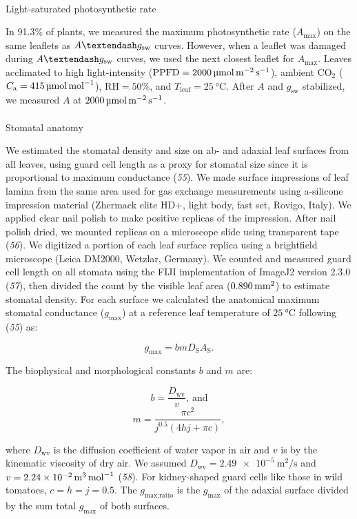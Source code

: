 \documentclass[
  letterpaper,
  DIV=11,
  numbers=noendperiod]{scrartcl}
\makeatletter
\let\oldparagraph\paragraph
\renewcommand{\paragraph}{
    \@ifstar
      \xxxParagraphStar
      \xxxParagraphNoStar
  }
\newcommand{\xxxParagraphStar}[1]{\oldparagraph*{#1}\mbox{}}
\newcommand{\xxxParagraphNoStar}[1]{\oldparagraph{#1}\mbox{}}
\newcommand{\agcurve}{$A \textendash g_\text{sw}$}
\newcommand{\caequals}[1]{$C_\mathrm{a} = \qty{#1}{\micro\mol\raiseto{-1}\mol}$}
\newcommand{\gmax}{$g_\text{max}$}
\newcommand{\gmaxratio}{$g_\text{max,ratio}$}
\newcommand{\gsw}{$g_\text{sw}$}
\newcommand{\ppfdequals}[1]{$\mathrm{PPFD} = \qty{#1}{\micro\mol\raiseto{-2}\meter\raiseto{-1}\second}$}
\newcommand{\rhequals}[1]{$\mathrm{RH} = #1\%$}
\newcommand{\tleafequals}[1]{$T_\mathrm{leaf} = \qty{#1}{\degreeCelsius}$}
\makeatother
\begin{document}
\paragraph{Light-saturated photosynthetic
rate}\label{light-saturated-photosynthetic-rate}

In 91.3\% of plants, we measured the maximum photosynthetic rate
(\(A_\mathrm{max}\)) on the same leaflets as \agcurve{} curves. However,
when a leaflet was damaged during \agcurve{} curves, we used the next
closest leaflet for \(A_\mathrm{max}\). Leaves acclimated to high
light-intensity (\ppfdequals{2000}), ambient CO\(_2\) (\caequals{415}),
\rhequals{50}, and \tleafequals{25}. After \(A\) and \gsw{} stabilized,
we measured \(A\) at
\(\qty{2000}{\micro\mol\raiseto{-2}\meter\raiseto{-1}\second}\).

\paragraph{Stomatal anatomy}\label{stomatal-anatomy}

We estimated the stomatal density and size on ab- and adaxial leaf
surfaces from all leaves, using guard cell length as a proxy for
stomatal size since it is proportional to maximum conductance
(\emph{55}). We made surface impressions of leaf lamina from the same
area used for gas exchange measurements using a-silicone impression
material (Zhermack elite HD+, light body, fast set, Rovigo, Italy). We
applied clear nail polish to make positive replicas of the impression.
After nail polish dried, we mounted replicas on a microscope slide using
transparent tape (\emph{56}). We digitized a portion of each leaf
surface replica using a brightfield microscope (Leica DM2000, Wetzlar,
Germany). We counted and measured guard cell length on all stomata using
the FIJI implementation of ImageJ2 version 2.3.0 (\emph{57}), then
divided the count by the visible leaf area
(\(\qty{0.890}{\raiseto{2}\milli\meter}\)) to estimate stomatal density.
For each surface we calculated the anatomical maximum stomatal
conductance (\gmax) at a reference leaf temperature of
\(\qty{25}{\degreeCelsius}\) following (\emph{55}) as:

\[g_\mathrm{max} = b m D_\mathrm{S} A_\mathrm{S}.\]

The biophysical and morphological constants \(b\) and \(m\) are:

\[b = \frac{D_\mathrm{wv}}{v},~\text{and}\]
\[m = \frac{\pi c ^ 2}{j^{0.5} (4 h j + \pi c)},\]

where \(D_\mathrm{wv}\) is the diffusion coefficient of water vapor in
air and \(v\) is by the kinematic viscosity of dry air. We assumed
\(D_\mathrm{wv} = \qty{2.49e-5}{\meter\squared\per\second}\) and
\(v = \qty{2.24e-2}{\raiseto{3}\meter\per\mol}\) (\emph{58}). For
kidney-shaped guard cells like those in wild tomatoes,
\(c = h = j = 0.5\). The \gmaxratio{} is the \gmax{} of the adaxial
surface divided by the sum total \gmax{} of both surfaces.
\end{document}
